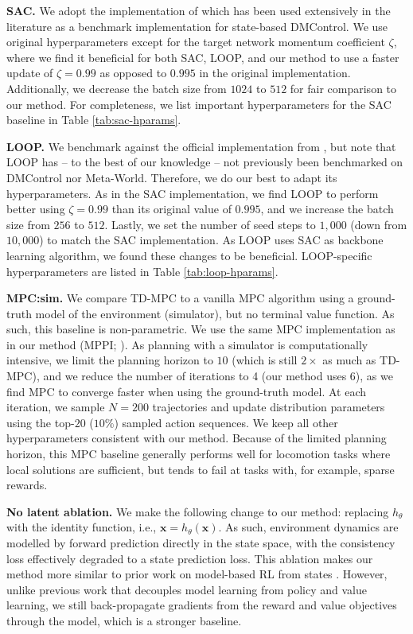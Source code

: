 \documentclass{article}
\begin{document}
\textbf{SAC.} We adopt the implementation of \citet{pytorch_sac} which has been used extensively in the literature as a benchmark implementation for state-based DMControl. We use original hyperparameters except for the target network momentum coefficient $\zeta$, where we find it beneficial for both SAC, LOOP, and our method to use a faster update of $\zeta = 0.99$ as opposed to $0.995$ in the original implementation. Additionally, we decrease the batch size from $1024$ to $512$ for fair comparison to our method. For completeness, we list important hyperparameters for the SAC baseline in Table \ref{tab:sac-hparams}.

\textbf{LOOP.} We benchmark against the official implementation from \citet{Sikchi2020LearningOW}, but note that LOOP has -- to the best of our knowledge -- not previously been benchmarked on DMControl nor Meta-World. Therefore, we do our best to adapt its hyperparameters. As in the SAC implementation, we find LOOP to perform better using $\zeta = 0.99$ than its original value of $0.995$, and we increase the batch size from $256$ to $512$. Lastly, we set the number of seed steps to $1,000$ (down from $10,000$) to match the SAC implementation. As LOOP uses SAC as backbone learning algorithm, we found these changes to be beneficial. LOOP-specific hyperparameters are listed in Table \ref{tab:loop-hparams}.

\textbf{MPC:sim.} We compare TD-MPC to a vanilla MPC algorithm using a ground-truth model of the environment (simulator), but no terminal value function. As such, this baseline is non-parametric. We use the same MPC implementation as in our method (MPPI; \citet{Williams2015ModelPP}). As planning with a simulator is computationally intensive, we limit the planning horizon to $10$ (which is still $2\times$ as much as TD-MPC), and we reduce the number of iterations to 4 (our method uses 6), as we find MPC to converge faster when using the ground-truth model. At each iteration, we sample $N=200$ trajectories and update distribution parameters using the top-$20$ ($10\%$) sampled action sequences. We keep all other hyperparameters consistent with our method. Because of the limited planning horizon, this MPC baseline generally performs well for locomotion tasks where local solutions are sufficient, but tends to fail at tasks with, for example, sparse rewards.

\textbf{No latent ablation.} We make the following change to our method: replacing $h_{\theta}$ with the identity function, i.e., $\mathbf{x} = h_{\theta}(\mathbf{x})$. As such, environment dynamics are modelled by forward prediction directly in the state space, with the consistency loss effectively degraded to a state prediction loss. This ablation makes our method more similar to prior work on model-based RL from states \citep{Janner2019WhenTT, Lowrey2019PlanOL, Sikchi2020LearningOW, Argenson2021ModelBasedOP}. However, unlike previous work that decouples model learning from policy and value learning, we still back-propagate gradients from the reward and value objectives through the model, which is a stronger baseline.
\end{document}
